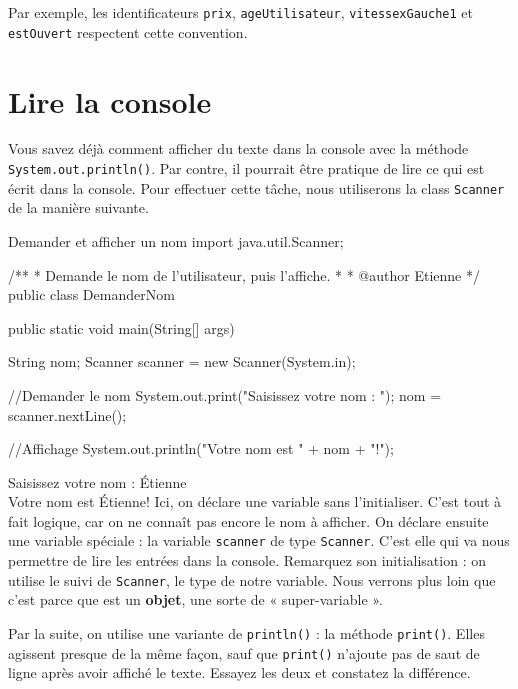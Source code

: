 \documentclass[12pt]{report}
\newcommand{\commande}[1]{%
\tcbox[on line, size=fbox, colframe=black, boxrule=0.75pt, tcbox raise base]{#1} %
}
\newenvironment{console}
	{
	\tcolorbox[title={Sortie console}, sharp corners = south, boxsep = 1.5mm]{} \tt
	}{\endtcolorbox}
\begin{document}
Par exemple, les identificateurs \texttt{prix}, \texttt{ageUtilisateur}, \texttt{vitessexGauche1} et \texttt{estOuvert} respectent cette convention. 




%
\section{Lire la console}
%
Vous savez déjà comment afficher du texte dans la console avec la méthode \texttt{System.out.println()}. Par contre, il pourrait être pratique de lire ce qui est écrit dans la console. Pour effectuer cette tâche, nous utiliserons la class \texttt{Scanner} de la manière suivante.

%
\begin{MyTCB}{Demander et afficher un nom}
import java.util.Scanner;

/**
 * Demande le nom de l'utilisateur, puis l'affiche.
 * 
 * @author Etienne
 */
public class DemanderNom {

	public static void main(String[] args) {
		
		String nom;
		Scanner scanner = new Scanner(System.in);
		
		//Demander le nom
		System.out.print("Saisissez votre nom : ");
		nom = scanner.nextLine();
		
		//Affichage
		System.out.println("Votre nom est " + nom + "!");

	}

}
\end{MyTCB}

\begin{console}
Saisissez votre nom : {\color{blue} Étienne}\\
Votre nom est Étienne!
\end{console}
Ici, on déclare une variable sans l'initialiser. C'est tout à fait logique, car on ne connaît pas encore le nom à afficher. On déclare ensuite une variable spéciale : la variable \texttt{scanner} de type \texttt{Scanner}. C'est elle qui va nous permettre de lire les entrées dans la console. Remarquez son initialisation : on utilise le \commande{new} suivi de \texttt{Scanner}, le type de notre variable. Nous verrons plus loin que c'est parce que \commande{scanner} est un \textbf{objet}, une sorte de « super-variable ». 

Par la suite, on utilise une variante de \texttt{println()} : la méthode \texttt{print()}. Elles agissent presque de la même façon, sauf que \texttt{print()} n'ajoute pas de saut de ligne après avoir affiché le texte. Essayez les deux et constatez la différence.
\end{document}
